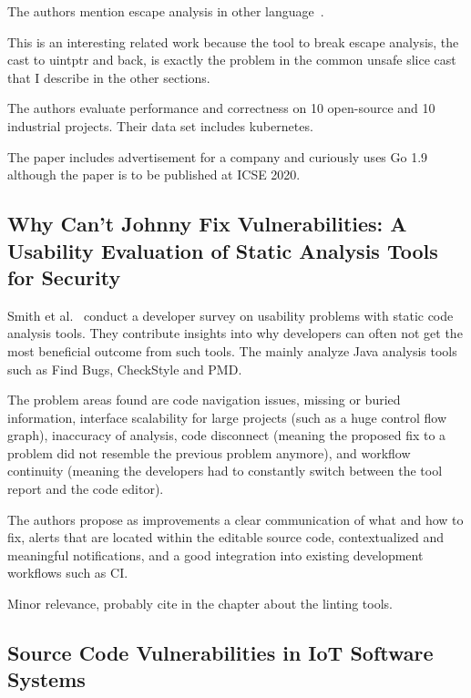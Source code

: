 The authors mention escape analysis in other language~\cite{hill2002, hannan1998, choi1999}.

This is an interesting related work because the tool to break escape analysis, the cast to uintptr and back, is exactly
the problem in the common unsafe slice cast that I describe in the other sections.

The authors evaluate performance and correctness on 10 open-source and 10 industrial projects.
Their data set includes kubernetes.

The paper includes advertisement for a company and curiously uses Go 1.9 although the paper is to be published at ICSE
2020.



\subsection{Why Can’t Johnny Fix Vulnerabilities: A Usability Evaluation of Static Analysis Tools for Security}
\label{subsec:why-can’t-johnny-fix-vulnerabilities:-a-usability-evaluation-of-static-analysis-tools-for-security}

Smith et al.~\cite{smith2020} conduct a developer survey on usability problems with static code analysis tools.
They contribute insights into why developers can often not get the most beneficial outcome from such tools.
The mainly analyze Java analysis tools such as Find Bugs, CheckStyle and PMD\@.

The problem areas found are code navigation issues, missing or buried information, interface scalability for large
projects (such as a huge control flow graph), inaccuracy of analysis, code disconnect (meaning the proposed fix to a
problem did not resemble the previous problem anymore), and workflow continuity (meaning the developers had to
constantly switch between the tool report and the code editor).

The authors propose as improvements a clear communication of what and how to fix, alerts that are located within the
editable source code, contextualized and meaningful notifications, and a good integration into existing development
workflows such as CI.

Minor relevance, probably cite in the chapter about the linting tools.



\subsection{Source Code Vulnerabilities in IoT Software Systems}
\label{subsec:source-code-vulnerabilities-in-iot-software-systems}

